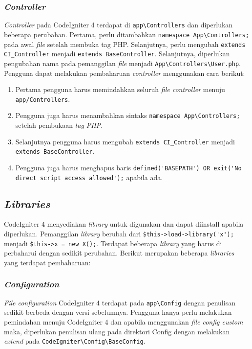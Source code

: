 \subsubsection{\textit{Controller}}
\textit{Controller} pada CodeIgniter 4 terdapat di \verb|app\Controllers| dan diperlukan beberapa perubahan. Pertama, perlu ditambahkan \verb|namespace App\Controllers;| pada awal \textit{file} setelah membuka tag PHP. Selanjutnya, perlu mengubah \verb|extends CI_Controller| menjadi \verb|extends BaseController|. Selanjutnya, diperlukan pengubahan nama pada pemanggilan \textit{file} menjadi \verb|App\Controllers\User.php|. Pengguna dapat melakukan pembaharuan \textit{controller} menggunakan cara berikut:
\begin{enumerate}
\item Pertama pengguna harus memindahkan seluruh \textit{file controller} menuju \verb|app/Controllers|.
\item Pengguna juga harus menambahkan sintaks \verb|namespace App\Controllers;| setelah pembukaan \textit{tag PHP}.
\item Selanjutnya pengguna harus mengubah \verb|extends CI_Controller| menjadi \verb|extends BaseController|.
\item Pengguna juga harus menghapus baris \verb|defined('BASEPATH') OR exit('No direct script access allowed');| apabila ada.
\end{enumerate}
 
\subsection{\textit{Libraries}}
 
CodeIgniter 4 menyediakan \textit{library} untuk digunakan dan dapat diinstall apabila diperlukan. Pemanggilan \textit{library} berubah dari \verb|$this->load->library('x');| menjadi \verb|$this->x = new X();|. Terdapat beberapa \textit{library} yang harus di perbaharui dengan sedikit perubahan. Berikut merupakan beberapa \textit{libraries} yang terdapat pembaharuan:
\subsubsection{\textit{Configuration}}

\textit{File configuration} CodeIgniter 4 terdapat pada \verb|app\Config| dengan penulisan sedikit berbeda dengan versi sebelumnya. Pengguna hanya perlu melakukan pemindahan menuju CodeIgniter 4 dan apabila menggunakan \textit{file config custom} maka, diperlukan penulisan ulang pada direktori Config dengan melakukan \textit{extend} pada \verb|CodeIgniter\Config\BaseConfig|.   

